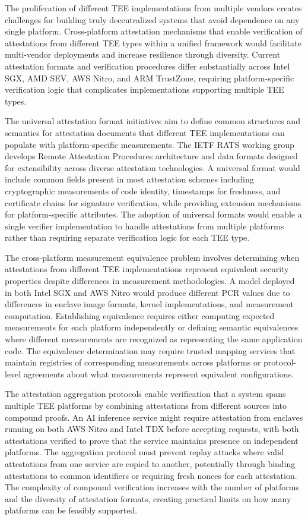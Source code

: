 The proliferation of different TEE implementations from multiple vendors creates challenges for building truly decentralized systems that avoid dependence on any single platform. Cross-platform attestation mechanisms that enable verification of attestations from different TEE types within a unified framework would facilitate multi-vendor deployments and increase resilience through diversity. Current attestation formats and verification procedures differ substantially across Intel SGX, AMD SEV, AWS Nitro, and ARM TrustZone, requiring platform-specific verification logic that complicates implementations supporting multiple TEE types.

The universal attestation format initiatives aim to define common structures and semantics for attestation documents that different TEE implementations can populate with platform-specific measurements. The IETF RATS working group develops Remote Attestation Procedures architecture and data formats designed for extensibility across diverse attestation technologies. A universal format would include common fields present in most attestation schemes including cryptographic measurements of code identity, timestamps for freshness, and certificate chains for signature verification, while providing extension mechanisms for platform-specific attributes. The adoption of universal formats would enable a single verifier implementation to handle attestations from multiple platforms rather than requiring separate verification logic for each TEE type.

The cross-platform measurement equivalence problem involves determining when attestations from different TEE implementations represent equivalent security properties despite differences in measurement methodologies. A model deployed in both Intel SGX and AWS Nitro would produce different PCR values due to differences in enclave image formats, kernel implementations, and measurement computation. Establishing equivalence requires either computing expected measurements for each platform independently or defining semantic equivalences where different measurements are recognized as representing the same application code. The equivalence determination may require trusted mapping services that maintain registries of corresponding measurements across platforms or protocol-level agreements about what measurements represent equivalent configurations.

The attestation aggregation protocols enable verification that a system spans multiple TEE platforms by combining attestations from different sources into compound proofs. An AI inference service might require attestation from enclaves running on both AWS Nitro and Intel TDX before accepting requests, with both attestations verified to prove that the service maintains presence on independent platforms. The aggregation protocol must prevent replay attacks where valid attestations from one service are copied to another, potentially through binding attestations to common identifiers or requiring fresh nonces for each attestation. The complexity of compound verification increases with the number of platforms and the diversity of attestation formats, creating practical limits on how many platforms can be feasibly supported.


